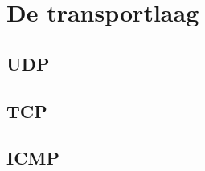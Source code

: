 \section{De transportlaag}

\begin{frame}
\end{frame}

\subsection{UDP}

\begin{frame}
\end{frame}

\subsection{TCP}

\begin{frame}
\end{frame}

\subsection{ICMP}

\begin{frame}
\end{frame}

